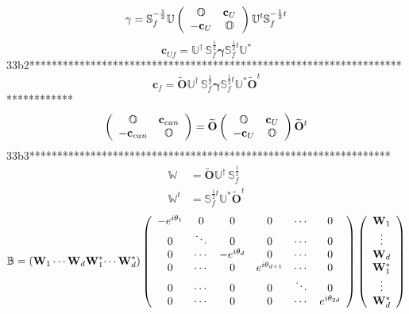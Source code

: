 \documentclass[aps,preprint]{revtex4}%
\begin{document}
\[
\mathbf{\gamma}=\mathbb{S}_{f}^{-\frac{1}{2}}\mathbb{U}\left(
\begin{array}
[c]{cc}%
\mathbb{O} & \mathbf{c}_{U}\\
-\mathbf{c}_{U} & \mathbb{O}%
\end{array}
\right)  \mathbb{U}^{t}\mathbb{S}_{f}^{-\frac{1}{2}t}%
\]%
\[
\mathbf{c}_{Uf}=\mathbb{U}^{\dagger}\,\mathbb{S}_{f}^{\frac{1}{2}%
}\mathbf{\gamma}\mathbb{S}_{f}^{\frac{1}{2}t}\mathbb{U}^{\ast}%
\]
33b2*******************************************************************%
\[
\mathbf{c}_{f}=\widetilde{\mathbf{O}}\mathbb{U}^{\dagger}\,\mathbb{S}%
_{f}^{\frac{1}{2}}\mathbf{\gamma}\mathbb{S}_{f}^{\frac{1}{2}t}\mathbb{U}%
^{\ast}\widetilde{\mathbf{O}}^{t}%
\]
************%
\[
\left(
\begin{array}
[c]{cc}%
\mathbb{O} & \mathbf{c}_{can}\\
-\mathbf{c}_{can} & \mathbb{O}%
\end{array}
\right)  =\widetilde{\mathbf{O}}\left(
\begin{array}
[c]{cc}%
\mathbb{O} & \mathbf{c}_{U}\\
-\mathbf{c}_{U} & \mathbb{O}%
\end{array}
\right)  \widetilde{\mathbf{O}}^{t}%
\]
33b3*****************************************************************%
\begin{align*}
\mathbb{W}  &  =\widetilde{\mathbf{O}}\mathbb{U}^{\dagger}\,\mathbb{S}%
_{f}^{\frac{1}{2}}\\
\mathbb{W}^{t}  &  =\mathbb{S}_{f}^{\frac{1}{2}t}\mathbb{U}^{\ast}%
\widetilde{\mathbf{O}}^{t}%
\end{align*}%
\[
\mathbb{B}=\left(  \mathbf{W}_{1}\cdots\mathbf{W}_{d}\mathbf{W}_{1}^{\ast
}\mathbf{\cdots W}_{d}^{\ast}\right)  \left(
\begin{array}
[c]{cccccc}%
-e^{i\theta_{1}} & 0 & 0 & 0 & \cdots & 0\\
0 & \ddots & 0 & 0 & \cdots & 0\\
0 & \cdots & -e^{i\theta_{d}} & 0 & \cdots & 0\\
0 & \cdots & 0 & e^{i\theta_{d+1}} & \cdots & 0\\
0 & \cdots & 0 & 0 & \ddots & 0\\
0 & \cdots & 0 & 0 & \cdots & e^{i\theta_{2d}}%
\end{array}
\right)  \left(
\begin{array}
[c]{c}%
\mathbf{W}_{1}\\
\vdots\\
\mathbf{W}_{d}\\
\mathbf{W}_{1}^{\ast}\\
\vdots\\
\mathbf{W}_{d}^{\ast}%
\end{array}
\right)
\]
\end{document}
